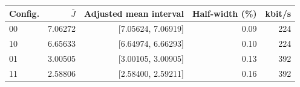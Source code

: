 \begin{tabular}{lrrrr}
\toprule
Config. & $\bar J$ & Adjusted mean interval & Half-width (\%) & kbit/s \\
\midrule
00 & 7.06272 & [7.05624, 7.06919] & 0.09 & 224 \\
10 & 6.65633 & [6.64974, 6.66293] & 0.10 & 224 \\
01 & 3.00505 & [3.00105, 3.00905] & 0.13 & 392 \\
11 & 2.58806 & [2.58400, 2.59211] & 0.16 & 392 \\
\bottomrule
\end{tabular}
